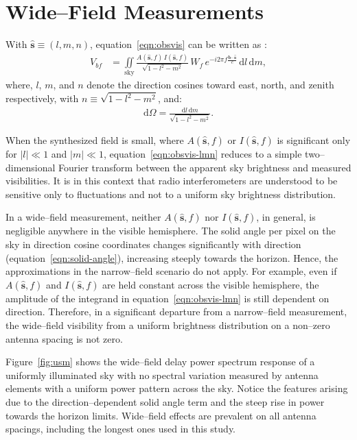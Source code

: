 \documentclass[preprint2,iop,numberedappendix,twocolappendix,appendixfloats]{emulateapj}
\newcommand{\dif}{\mathrm{d}}
\begin{document}
\section{Wide--Field Measurements}\label{sec:wide-field}

With $\hat{\boldsymbol{s}}\equiv (l,m,n)$, equation~\ref{eqn:obsvis} can be written as \citep{tay99,tho01}:
\begin{align}\label{eqn:obsvis-lmn}
  V_{bf} &= \iint\limits_\textrm{sky} \frac{A(\hat{\boldsymbol{s}},f)\,I(\hat{\boldsymbol{s}},f)}{\sqrt{1-l^2-m^2}}\,W_f\,e^{-i2\pi f\frac{\boldsymbol{b}\cdot\hat{\boldsymbol{s}}}{c}}\,\dif l\,\dif m, 
\end{align}
where, $l$, $m$, and $n$ denote the direction cosines toward east, north, and zenith respectively, with $n\equiv\sqrt{1-l^2-m^2}$, and:
\begin{align}\label{eqn:solid-angle}
  \dif\Omega = \frac{\dif l\,\dif m}{\sqrt{1-l^2-m^2}}.
\end{align}

When the synthesized field is small, where $A(\hat{\boldsymbol{s}},f)$ or $I(\hat{\boldsymbol{s}},f)$ is significant only for $|l| \ll 1$ and $|m| \ll 1$, equation~\ref{eqn:obsvis-lmn} reduces to a simple two--dimensional Fourier transform \citep{tay99,tho01} between the apparent sky brightness and measured visibilities. It is in this context that radio interferometers are understood to be sensitive only to fluctuations and not to a uniform sky brightness distribution. 

In a wide--field measurement, neither $A(\hat{\boldsymbol{s}},f)$ nor $I(\hat{\boldsymbol{s}},f)$, in general, is negligible anywhere in the visible hemisphere. The solid angle per pixel on the sky in direction cosine coordinates changes significantly with direction (equation~\ref{eqn:solid-angle}), increasing steeply towards the horizon. Hence, the approximations in the narrow--field scenario do not apply. For example, even if $A(\hat{\boldsymbol{s}},f)$ and $I(\hat{\boldsymbol{s}},f)$ are held constant across the visible hemisphere, the amplitude of the integrand in equation~\ref{eqn:obsvis-lmn} is still dependent on direction. Therefore, in a significant departure from a narrow--field measurement, the wide--field visibility from a uniform brightness distribution on a non--zero antenna spacing is not zero.

Figure~\ref{fig:usm} shows the wide--field delay power spectrum response of a uniformly illuminated sky with no spectral variation measured by antenna elements with a uniform power pattern across the sky. Notice the features arising due to the direction--dependent solid angle term and the steep rise in power towards the horizon limits. Wide--field effects are prevalent on all antenna spacings, including the longest ones used in this study. 
\end{document}
